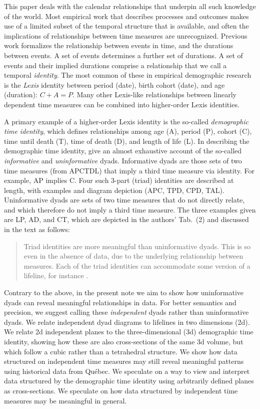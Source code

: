 \documentclass{bmcart}
\begin{document}
This paper deals with the calendar relationships that underpin all such knowledge of the world. Most empirical work that describes processes and outcomes makes use of a limited subset of the temporal structure that is available, and often the implications of relationships between time measures are unrecognized. Previous work \citep{riffe2017demographictime} formalizes the relationship between events in time, and the durations between events. A set of events determines a further set of durations. A set of events and their implied durations comprise a relationship that we call a temporal \emph{identity}. The most common of these in empirical demographic research is the \emph{Lexis} identity between period (date), birth cohort (date), and age (duration): $C + A = P$. Many other Lexis-like relationships between linearly dependent time measures can be combined into higher-order Lexis identities. 

A primary example of a higher-order Lexis identity is the so-called \emph{demographic time identity}, which defines relationships among age (A), period (P), cohort (C), time until death (T), time of death (D), and length of life (L). In describing the demographic time identity, \citet{riffe2017demographictime} give an almost exhaustive account of the so-called \emph{informative} and \emph{uninformative} dyads. Informative dyads are those sets of two time measures (from APCTDL) that imply a third time measure via identity. For example, AP implies C. Four such 3-part (triad) identities are described at length, with examples and diagram depiction (APC, TPD, CPD, TAL). Uninformative dyads are sets of two time measures that do not directly relate, and which therefore do not imply a third time measure. The three examples given are LP, AD, and CT, which are depicted in the authors' Tab.~(2) and discussed in the text as follows:
\begin{quote}
Triad identities are more meaningful than uninformative dyads. This is so even in the absence of data, due to the underlying relationship between measures. Each of the triad identities can accommodate some version of a lifeline, for instance \citep[p5][]{riffe2017demographictime}. 
\end{quote}

Contrary to the above, in the present note we aim to show how uninformative dyads can reveal meaningful relationships in data. For better semantics and precision, we suggest calling these \emph{independent} dyads rather than uninformative dyads. We relate independent dyad diagrams to lifelines in two dimensions (2d). We relate 2d independent planes to the three-dimensional (3d) demographic time identity, showing how these are also cross-sections of the same 3d volume, but which follow a cubic rather than a tetrahedral structure. We show how data structured on independent time measures may still reveal meaningful patterns using historical data from Qu\'{e}bec. We speculate on a way to view and interpret data structured by the demographic time identity using arbitrarily defined planes as cross-sections. We speculate on how data structured by independent time measures may be meaningful in general.
\end{document}
